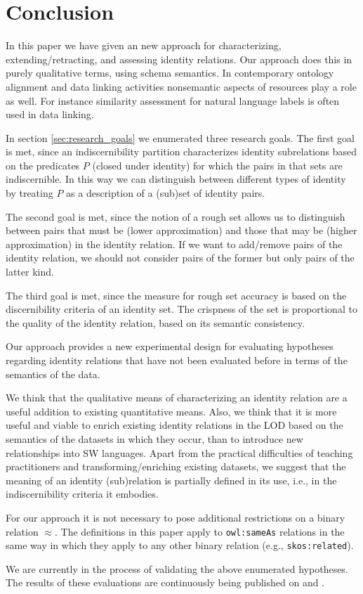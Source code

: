 \section{Conclusion}
\label{sec:conclusion}

In this paper we have given an new approach for characterizing,
  extending/retracting, and assessing identity relations.
Our approach does this in purely qualitative terms, using schema semantics.
In contemporary ontology alignment and data linking activities nonsemantic
  aspects of resources play a role as well.
For instance similarity assessment for natural language labels is often
  used in data linking.

In section \ref{sec:research_goals} we enumerated three research goals.
The first goal is met, since an indiscernibility partition characterizes
  identity subrelations based on the predicates $P$ (closed under identity)
  for which the pairs in that sets are indiscernible.
In this way we can distinguish between different types of identity
  by treating $P$ as a description of a (sub)set of identity pairs.

The second goal is met, since the notion of a rough set allows us to
  distinguish between pairs that must be (lower approximation)
  and those that may be (higher approximation)
  in the identity relation.
If we want to add/remove pairs of the identity relation,
  we should not consider pairs of the former but only pairs of
  the latter kind.

The third goal is met, since the measure for rough set accuracy
  is based on the discernibility criteria of an identity set.
The crispness of the set is proportional to the quality of the
  identity relation, based on its semantic consistency.

Our approach provides a new experimental design for evaluating
  hypotheses regarding identity relations that have not been
  evaluated before in terms of the semantics of the data.

We think that the qualitative means of characterizing an identity relation
  are a useful addition to existing quantitative means.
Also, we think that it is more useful and viable to enrich existing
  identity relations in the LOD based on the semantics of the datasets
  in which they occur, than to introduce new relationships into SW languages.
Apart from the practical difficulties of teaching practitioners
  and transforming/enriching existing datasets, we suggest that the
  meaning of an identity (sub)relation is partially defined in its use,
  i.e., in the indiscernibility criteria it embodies.

For our approach it is not necessary to pose additional restrictions
  on a binary relation $\approx$.
The definitions in this paper apply to {\small \texttt{owl:sameAs}} relations
  in the same way in which they apply to any other binary relation
  (e.g., {\small \texttt{skos:related}}).

We are currently in the process of validating the above enumerated hypotheses.
The results of these evaluations are continuously being published on
   and
.
